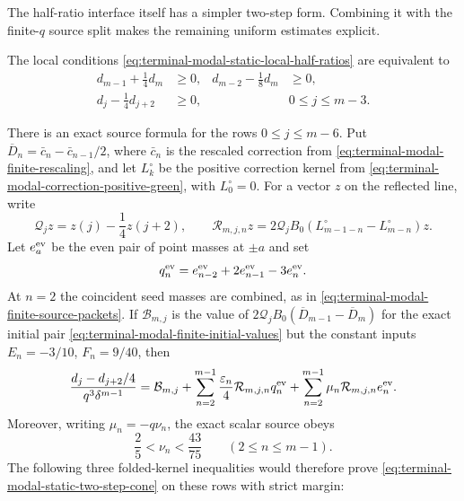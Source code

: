 The half-ratio interface itself has a simpler two-step form.  Combining it
with the finite-$q$ source split makes the remaining uniform estimates
explicit.

\begin{lemma}
\label{lem:terminal-modal-static-two-step-ledger}
The local conditions
\eqref{eq:terminal-modal-static-local-half-ratios} are equivalent to
\begin{align}
 d_{m-1}+\frac14d_m&\ge0,
 &d_{m-2}-\frac18d_m&\ge0,
 \label{eq:terminal-modal-static-two-step-frontier}\\
 d_j-\frac14d_{j+2}&\ge0,
 &&0\le j\le m-3.
 \label{eq:terminal-modal-static-two-step-cone}
\end{align}

There is an exact source formula for the rows $0\le j\le m-6$.  Put
$\overline D_n=\bar c_n-\bar c_{n-1}/2$, where $\bar c_n$ is the rescaled
correction from \eqref{eq:terminal-modal-finite-rescaling}, and let
$L_k^\circ$ be the positive correction kernel from
\eqref{eq:terminal-modal-correction-positive-green}, with $L_0^\circ=0$.
For a vector $z$ on the reflected line, write
\[
 \mathcal Q_jz=z(j)-\frac14z(j+2),
 \qquad
 \mathcal R_{m,j,n}z
 =2\mathcal Q_jB_0
 (L_{m-1-n}^\circ-L_{m-n}^\circ)z.
\]
Let $e_a^{\rm ev}$ be the even pair of point masses at $\pm a$ and set
\[
 q_n^{\rm ev}=e_{n-2}^{\rm ev}+2e_{n-1}^{\rm ev}-3e_n^{\rm ev}.
\]
At $n=2$ the coincident seed masses are combined, as in
\eqref{eq:terminal-modal-finite-source-packets}.  If $\mathcal B_{m,j}$ is
the value of $2\mathcal Q_jB_0(\overline D_{m-1}-\overline D_m)$ for the
exact initial pair \eqref{eq:terminal-modal-finite-initial-values} but the
constant inputs $E_n=-3/10$, $F_n=9/40$, then
\begin{equation}
 \frac{d_j-d_{j+2}/4}{q^3\delta^{m-1}}
 =\mathcal B_{m,j}
 +\sum_{n=2}^{m-1}\frac{\varepsilon_n}{4}
   \mathcal R_{m,j,n}q_n^{\rm ev}
 +\sum_{n=2}^{m-1}\mu_n
   \mathcal R_{m,j,n}e_n^{\rm ev}.
 \label{eq:terminal-modal-static-folded-source-ledger}
\end{equation}
Moreover, writing $\mu_n=-q\nu_n$, the exact scalar source obeys
\begin{equation}
 \frac25<\nu_n<\frac{43}{75}
 \qquad(2\le n\le m-1).
 \label{eq:terminal-modal-static-mass-window}
\end{equation}
The following three folded-kernel inequalities would therefore prove
\eqref{eq:terminal-modal-static-two-step-cone} on these rows with strict
margin:
\begin{align}

\end{align}
\end{lemma}
